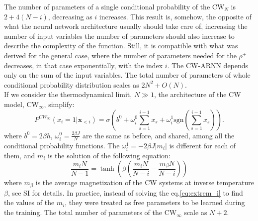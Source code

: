 \documentclass[aps,physrev,10pt,floatfix,reprint]{revtex4-2}
\begin{document}
The number of parameters of a single conditional probability of the CW$_N$ is $2+4(N-i)$, decreasing as $i$ increases. This result is, somehow, the opposite of what the neural network architecture usually should take care of, increasing the number of input variables the number of parameters should also increase to describe the complexity of the function. Still, it is compatible with what was derived for the general case, where the number of parameters needed for the $\rho^{\pm}$ decreases, in that case exponentially, with the index $i$. The CW-ARNN depends only on the sum of the input variables.
The total number of parameters of whole conditional probability distribution scales as $2N^2+ O(N)$. \\
If we consider the thermodynamical limit, $N \gg 1$, the architecture of the CW model, CW$_{\infty}$, simplify:
\begin{equation*}
    P^{CW_{\infty}}\left(x_{i}=1|\mathbf{x}_{<i}\right) =  \sigma \left(b^0+\omega_{i}^0\sum_{s=1}^{i-1}x_{s} + \omega_i^1 \text{sgn}(\sum_{s=1}^{i-1}x_{s})\right).
\end{equation*}
where $b^0=2\beta h$, $\omega^0_i = \frac{2\beta J}{N}$ are the same as before, and shared, among all the conditional probability functions. The $\omega^1_i = -2\beta J |m_i|$ is different for each of them, and $m_i$ is the solution of the following equation:
\begin{equation}
    \frac{m_i N}{N-1} = \tanh \left( \beta(\frac{m_i N}{N - i} - \frac{m_{\beta}N}{N-i}) \right)
    \label{eq:extrem_i}
    \end{equation}
where $m_{\beta}$ is the average magnetization of the CW systems at inverse temperature $\beta$, see SI for details. In practice, instead of solving the eq.\ref{eq:extrem_i} to find the values of the $m_i$, they were treated as free parameters to be learned during the training. The total number of parameters of the CW$_{\infty}$ scale as $N+2$.
    
\end{document}
